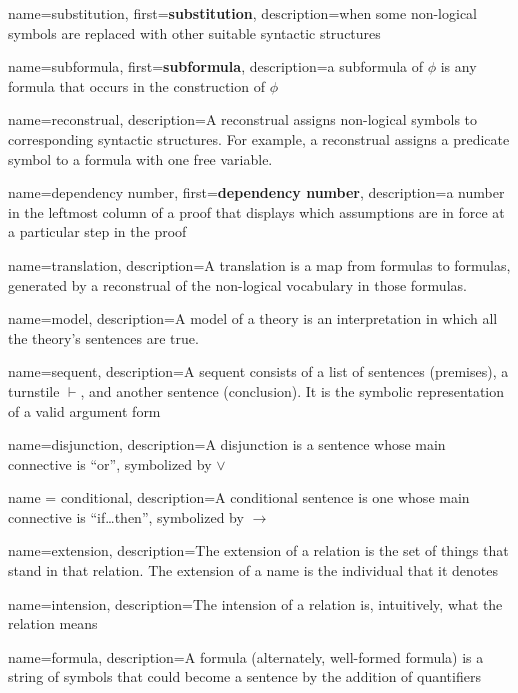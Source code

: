 \documentclass[fleqn]{tufte-book}
\renewcommand{\emph}{\textbf}
\numberwithin{prop}{chapter}
\theoremstyle{definition}
\numberwithin{exercise}{chapter}
\begin{document}
 { name={substitution},
  first={\emph{substitution}}, description={when some non-logical
    symbols are replaced with other suitable syntactic structures}}

 { name={subformula},
  first={\emph{subformula}}, description={a subformula of $\phi$ is
    any formula that occurs in the construction of $\phi$}}

 { name={reconstrual}, description={A
    reconstrual assigns non-logical symbols to corresponding syntactic
    structures.  For example, a reconstrual assigns a predicate symbol
    to a formula with one free variable.}  }

 { name={dependency number},
  first={\emph{dependency number}}, description={a number in the
    leftmost column of a proof that displays which assumptions are in
    force at a particular step in the proof}  }

{
  name={translation},
  description={A translation is a map from formulas to formulas,
    generated by a reconstrual of the non-logical vocabulary in those formulas.}
}

{
  name={model},
  description={A model of a theory is an interpretation in which all the theory's sentences are true.}
}

{
  name={sequent},
  description={A sequent consists of a list of sentences (premises), a
    turnstile $\vdash$, and another sentence (conclusion).  It is the
    symbolic representation of a valid argument form}
}

{
  name={disjunction},
  description={A disjunction is a sentence whose main connective is
    ``or'', symbolized by $\vee$}
}

{
  name = {conditional},
  description={A conditional sentence is one whose main connective is
    ``if\dots then'', symbolized by $\to$}
}

{
  name={extension},
  description={The extension of a relation is the set of things that
    stand in that relation.  The extension of a name is the individual that it denotes}
}

{
  name={intension},
  description={The intension of a relation is, intuitively, what the relation means}
}

{
  name={formula},
  description={A formula (alternately, well-formed formula) is a
    string of symbols that could become a sentence by the addition of quantifiers}
}
\end{document}
